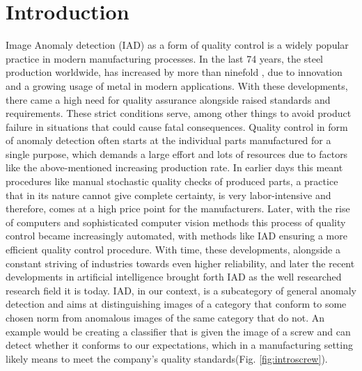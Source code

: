 \chapter{Introduction}
\label{chap:introduction}

Image Anomaly detection (IAD) as a form of quality control is a widely popular practice in modern manufacturing processes. In the last 74 years, the steel production worldwide, 
has increased by more than ninefold \cite{worldsteel}, due to innovation and a growing usage of metal in modern applications. 
With these developments, there came a high need for quality 
assurance alongside raised standards and requirements. These strict conditions serve, among other things 
to avoid product failure in situations that could cause fatal consequences. Quality control in form of anomaly detection often 
starts at the individual parts manufactured for a single purpose, which demands a large effort and lots of resources due to factors like 
the above-mentioned increasing production rate. 
In earlier days this meant procedures like manual stochastic quality checks of produced parts, a practice that in its nature cannot give 
complete certainty, is very labor-intensive and therefore, comes at a high price point for the manufacturers. Later, with the rise of computers and sophisticated computer vision methods 
this process of quality control became increasingly automated, with methods like IAD ensuring a more efficient quality control procedure. With time, these developments, 
alongside a constant striving of industries towards even higher reliability, and later the recent developments in artificial intelligence brought forth IAD as the 
well researched research field it is today.\newline 
IAD, in our context, is a subcategory of general anomaly detection 
and aims at distinguishing images of a category that conform to some chosen norm from anomalous images of the same category that do not. 
An example would be creating a classifier that is given the image of a screw and can detect whether it conforms to our expectations, 
which in a manufacturing setting likely means to meet the company's quality standards(Fig. \ref{fig:introscrew}).




